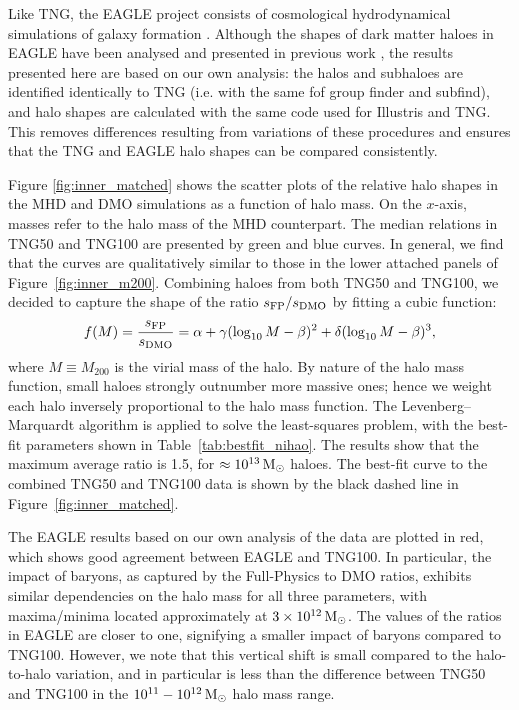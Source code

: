 \documentclass[fleqn,usenatbib]{mnras}
\def\msun{\,\rm M_{\odot}}
\begin{document}
Like TNG, the EAGLE project consists of cosmological hydrodynamical simulations of galaxy formation \citep{EAGLE}.
Although the shapes of dark matter haloes in EAGLE have been analysed and presented in previous work \cite[e.g.][]{Cataldi21v501}, the results presented here are based on our own analysis: 
the halos and subhaloes are identified identically to TNG (i.e. with the same {\sc fof} group finder and {\sc subfind}), 
and halo shapes are calculated with the same code used for Illustris and TNG.
This removes differences resulting from variations of these procedures and ensures that the TNG and EAGLE halo shapes can be compared consistently.



Figure \ref{fig:inner_matched} shows the scatter plots of the relative halo shapes in the MHD and DMO simulations as a function of halo mass.
On the $x$-axis, masses refer to the halo mass of the MHD counterpart. 
The median relations in TNG50 and TNG100 are presented by green and blue curves.
In general, we find that the curves are qualitatively similar to those in the lower attached panels of Figure~\ref{fig:inner_m200}.
Combining haloes from both TNG50 and TNG100, we decided to capture the shape of the ratio $s_{\rm FP}/s_{\rm DMO}$ by fitting a cubic function:
\begin{equation}
f(M) = \frac{s_{\rm FP}}{s_{\rm DMO}} = \alpha + \gamma (\log_{10}M-\beta)^2 + \delta(\log_{10}M-\beta)^3,
\label{eqn:cubic}
\end{equation}
where $M \equiv M_{200}$ is the virial mass of the halo.
By nature of the halo mass function, small haloes strongly outnumber more massive ones; hence we weight each halo  inversely proportional to the halo mass function.
The Levenberg–Marquardt algorithm is applied to solve the least-squares problem, with the best-fit parameters shown in Table~\ref{tab:bestfit_nihao}.
The results show that the maximum average ratio is 1.5, for $\approx 10^{13} \msun$ haloes.
The best-fit curve to the combined TNG50 and TNG100 data is shown by the black dashed line in Figure~\ref{fig:inner_matched}.

The EAGLE results based on our own analysis of the data are plotted in red, which shows good agreement between EAGLE and TNG100.
In particular, the impact of baryons, as captured by the Full-Physics to DMO ratios, exhibits similar dependencies on the halo mass for all three parameters, with maxima/minima located  approximately at $3 \times 10^{12} \msun$.
The values of the ratios in EAGLE are closer to one, signifying a smaller impact of baryons compared to TNG100.
However, we note that this vertical shift is small compared to the halo-to-halo variation, and in particular is less than the difference between TNG50 and TNG100 in the $10^{11} - 10^{12} \msun$ halo mass range.
\end{document}

